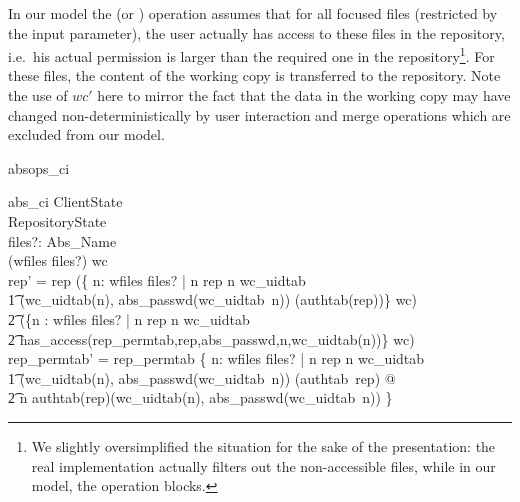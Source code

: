 In our model the  (or ) operation assumes that 
for all focused files (restricted by the input parameter), the user actually has access
to these files in the repository, i.e.\ his actual permission is larger than the
required one in the repository\footnote{We slightly oversimplified the
  situation for the sake of the presentation: the real implementation actually
  filters out the non-accessible files, while in our model, the operation
  blocks.}. For these files, the content of the working copy is transferred to
the repository. Note the use of $wc'$ here to mirror the fact that the data in
the working copy may have changed non-deterministically by user interaction and
merge operations which are excluded from our model.
\enlargethispage{\baselineskip}
\begin{doc}{absops_ci}
  \begin{schema}{abs\_ci}
    \Xi ClientState \\
    \Delta RepositoryState  \\
    files?: \power Abs\_Name \\
    \where
    (wfiles \cap files?) \subseteq \dom wc \\

    rep' = rep \oplus (\{ n: wfiles \cap files? | n \notin \dom rep \land n \in
    \dom wc\_uidtab \\
    \t1 \land (wc\_uidtab(n), abs\_passwd(wc\_uidtab~n)) \in
    \dom(authtab(rep))\} \dres wc) \\  
    \t2 \oplus (\{n : wfiles \cap files? | n \in \dom rep \land n \in \dom
    wc\_uidtab \\
    \t2 \land has\_access(rep\_permtab,rep,abs\_passwd,n,wc\_uidtab(n))\}
    \dres wc) \\

    rep\_permtab' = rep\_permtab \oplus \{ n: wfiles \cap files? |  n \notin
    \dom rep \land n \in \dom wc\_uidtab \\
    \t1 \land (wc\_uidtab(n), abs\_passwd(wc\_uidtab~n)) \in \dom(authtab~rep) @
    \\
    \t2 n \mapsto authtab(rep)(wc\_uidtab(n), abs\_passwd(wc\_uidtab~n)) \} \\

  \end{schema}
\end{doc}

